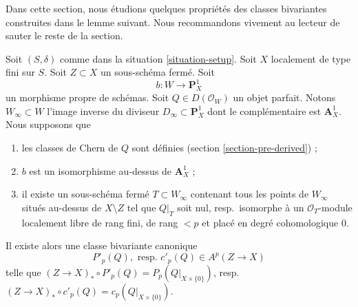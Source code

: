 \noindent
Dans cette section, nous étudions quelques propriétés des classes bivariantes
construites dans le lemme suivant. Nous recommandons vivement au
lecteur de sauter le reste de la section.

\begin{lemma}
\label{lemma-localized-chern-pre}
Soit $(S, \delta)$ comme dans la situation \ref{situation-setup}. Soit $X$
localement de type fini sur $S$. Soit $Z \subset X$ un sous-schéma fermé.
Soit
$$
b : W \longrightarrow \mathbf{P}^1_X
$$
un morphisme propre de schémas. Soit $Q \in D(\mathcal{O}_W)$ un
objet parfait. Notons $W_\infty \subset W$ l'image inverse du diviseur
$D_\infty \subset \mathbf{P}^1_X$ dont le complémentaire est $\mathbf{A}^1_X$.
Nous supposons que
\begin{enumerate}
\item[(A0)] les classes de Chern de $Q$ sont définies
(section \ref{section-pre-derived}) ;
\item[(A1)] $b$ est un isomorphisme au-dessus de $\mathbf{A}^1_X$ ;
\item[(A2)] il existe un sous-schéma fermé $T \subset W_\infty$
contenant tous les points de $W_\infty$ situés au-dessus de $X \setminus Z$ tel que
$Q|_T$ soit nul, resp.\ isomorphe à un
$\mathcal{O}_T$-module localement libre de rang fini, de rang $< p$ et placé en degré cohomologique $0$.
\end{enumerate}
Il existe alors une classe bivariante canonique
$$
P'_p(Q),\text{ resp. }c'_p(Q) \in A^p(Z \to X)
$$
telle que
$(Z \to X)_* \circ P'_p(Q) = P_p(Q|_{X \times \{0\}})$,
resp.\ $(Z \to X)_* \circ c'_p(Q) = c_p(Q|_{X \times \{0\}})$.
\end{lemma}

